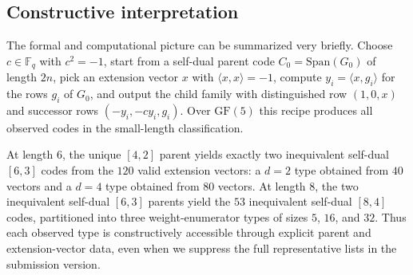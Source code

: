 \documentclass[12pt]{article}
\newcommand{\F}{\mathbb{F}}
\newcommand{\GF}[1]{\ensuremath{\mathrm{GF}(#1)}}
\newcommand{\Span}{\mathrm{Span}}
\begin{document}
\subsection{Constructive interpretation}

The formal and computational picture can be summarized very briefly. Choose $c \in \F_q$ with $c^2=-1$, start from a self-dual parent code $C_0=\Span(G_0)$ of length $2n$, pick an extension vector $x$ with $\langle x,x\rangle=-1$, compute $y_i=\langle x,g_i\rangle$ for the rows $g_i$ of $G_0$, and output the child family with distinguished row $(1,0,x)$ and successor rows $(-y_i,-cy_i,g_i)$. Over $\GF{5}$ this recipe produces all observed codes in the small-length classification.

At length $6$, the unique $[4,2]$ parent yields exactly two inequivalent self-dual $[6,3]$ codes from the $120$ valid extension vectors: a $d=2$ type obtained from $40$ vectors and a $d=4$ type obtained from $80$ vectors. At length $8$, the two inequivalent self-dual $[6,3]$ parents yield the $53$ inequivalent self-dual $[8,4]$ codes, partitioned into three weight-enumerator types of sizes $5$, $16$, and $32$. Thus each observed type is constructively accessible through explicit parent and extension-vector data, even when we suppress the full representative lists in the submission version.
\end{document}
